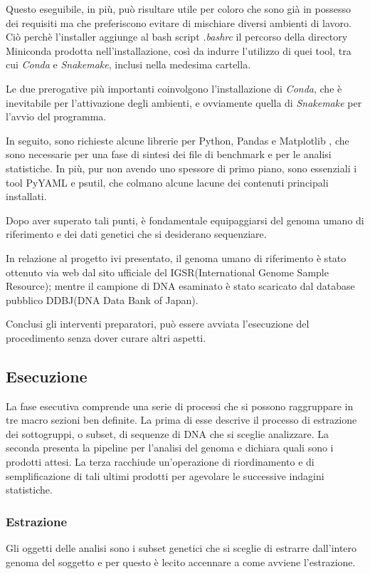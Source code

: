 Questo eseguibile, in più, può risultare utile per coloro che sono già in possesso dei requisiti ma che preferiscono evitare di mischiare diversi ambienti di lavoro.
Ciò perchè l'installer aggiunge al bash script \textit{.bashrc} il percorso della directory Miniconda prodotta nell'installazione, così da indurre l'utilizzo di quei tool, tra cui \textit{Conda} e \textit{Snakemake}, inclusi nella medesima cartella.


Le due prerogative più importanti coinvolgono l'installazione di \textit{Conda}, che è inevitabile per l'attivazione degli ambienti, e ovviamente quella di \textit{Snakemake} per l'avvio del programma.


In seguito, sono richieste alcune librerie per Python, Pandas \cite{pandas} e Matplotlib \cite{Matplotlib}, che sono necessarie per una fase di sintesi dei file di benchmark e per le analisi statistiche.
In più, pur non avendo uno spessore di primo piano, sono essenziali i tool PyYAML e psutil, che colmano alcune lacune dei contenuti principali installati.


Dopo aver superato tali punti, è fondamentale equipaggiarsi del genoma umano di riferimento e dei dati genetici che si desiderano sequenziare.


In relazione al progetto ivi presentato, il genoma umano di riferimento è stato ottenuto via web dal sito ufficiale del IGSR(International Genome Sample Resource); mentre il campione di DNA esaminato è stato scaricato dal database pubblico DDBJ(DNA Data Bank of Japan).


Conclusi gli interventi preparatori, può essere avviata l'esecuzione del procedimento senza dover curare altri aspetti.


\subsection{Esecuzione}
La fase esecutiva comprende una serie di processi che si possono raggruppare in tre macro sezioni ben definite.
La prima di esse descrive il processo di estrazione dei sottogruppi, o subset, di sequenze di DNA che si sceglie analizzare.
La seconda presenta la pipeline per l'analisi del genoma e dichiara quali sono i prodotti attesi.
La terza racchiude un'operazione di riordinamento e di semplificazione di tali ultimi prodotti per agevolare le successive indagini statistiche.



\subsubsection{Estrazione}
\label{subsubsec: ext}
Gli oggetti delle analisi sono i subset genetici che si sceglie di estrarre dall'intero genoma del soggetto e per questo è lecito accennare a come avviene l'estrazione.

